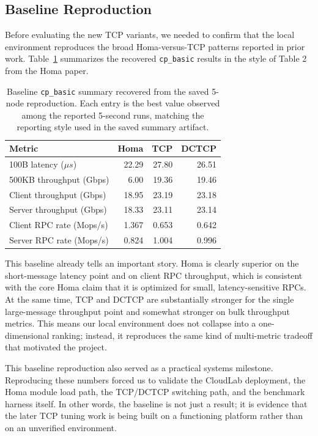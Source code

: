\documentclass[11pt]{article}
\begin{document}
\subsection{Baseline Reproduction}

Before evaluating the new TCP variants, we needed to confirm that the local environment reproduces the broad Homa-versus-TCP patterns reported in prior work. Table~\ref{tab:baseline} summarizes the recovered \texttt{cp\_basic} results in the style of Table 2 from the Homa paper.

\begin{table}[H]
\centering
\caption{Baseline \texttt{cp\_basic} summary recovered from the saved 5-node reproduction. Each entry is the best value observed among the reported 5-second runs, matching the reporting style used in the saved summary artifact.}
\label{tab:baseline}
\begin{tabular}{lrrr}
\toprule
Metric & Homa & TCP & DCTCP \\
\midrule
100B latency (\(\mu s\)) & 22.29 & 27.80 & 26.51 \\
500KB throughput (Gbps) & 6.00 & 19.36 & 19.46 \\
Client throughput (Gbps) & 18.95 & 23.19 & 23.18 \\
Server throughput (Gbps) & 18.33 & 23.11 & 23.14 \\
Client RPC rate (Mops/s) & 1.367 & 0.653 & 0.642 \\
Server RPC rate (Mops/s) & 0.824 & 1.004 & 0.996 \\
\bottomrule
\end{tabular}
\end{table}

This baseline already tells an important story. Homa is clearly superior on the short-message latency point and on client RPC throughput, which is consistent with the core Homa claim that it is optimized for small, latency-sensitive RPCs. At the same time, TCP and DCTCP are substantially stronger for the single large-message throughput point and somewhat stronger on bulk throughput metrics. This means our local environment does not collapse into a one-dimensional ranking; instead, it reproduces the same kind of multi-metric tradeoff that motivated the project.

This baseline reproduction also served as a practical systems milestone. Reproducing these numbers forced us to validate the CloudLab deployment, the Homa module load path, the TCP/DCTCP switching path, and the benchmark harness itself. In other words, the baseline is not just a result; it is evidence that the later TCP tuning work is being built on a functioning platform rather than on an unverified environment.
\end{document}

